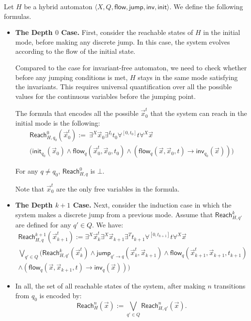 \documentclass[envcountsect]{llncs}
\newcommand{\flow}{\mathsf{flow}}
\newcommand{\jump}{\mathsf{jump}}
\newcommand{\inv}{\mathsf{inv}}
\newcommand{\init}{\mathsf{init}}
\newcommand{\reach}{\mathsf{Reach}}
\begin{document}
\begin{definition}[$\reach_H^n(\vec x)$, General Case]

Let $H$ be a hybrid automaton $\langle X, Q, \flow, \jump, \inv, \init\rangle$.
We define the following formulas. 

\begin{itemize}
\item {\bf The Depth $0$ Case.} First, consider the reachable states of $H$ in
the initial mode, before making any discrete jump. In this case, the system
evolves according to the flow of the initial state. 

Compared to the case for invariant-free automaton, we need to check whether
before any jumping conditions is met, $H$ stays in the same mode satisfying the
invariants. This requires universal quantification over all the possible values
for the continuous variables before the jumping point. 

The formula that encodes all the possible $\vec x_0^t$ that the system can
reach in the initial mode is the following:
\begin{multline*}
\reach^0_{H,q_0} (\vec x_0^t):=\ \exists^X \vec x_0 \exists^{I_t}
t_0\forall^{[0,t_0]} t\forall^X \vec x\\ \Big(\init_{q_0}(\vec x_0)\wedge
\flow_q(\vec x_0^t, \vec x_0, t_0)\wedge (\flow_q(\vec x, \vec x_0,
t)\rightarrow\inv_{q_0}(\vec x))\Big)
\end{multline*}

For any $q\neq q_0$, $\reach^0_{H,q}$ is $\bot$. 

Note that $\vec x_0^t$ are the only free variables in the formula. 



\item {\bf The Depth $k+1$ Case.} Next, consider the induction case in which
the system makes a discrete jump from a previous mode. Assume that
$\reach^k_{H,q'}$ are defined for any $q'\in Q$. We have:
\begin{multline*}
\reach^{k+1}_{H,q}(\vec x_{k+1}^t):=  \exists^X \vec x_k^t \exists^X \vec
x_{k+1}\exists^{T} t_{k+1}\forall^{[0,t_{k+1}]}t\forall^X \vec x \\
\bigvee_{q'\in Q} (\reach^k_{H,q'} (\vec x_k^t) \wedge \jump_{q'\rightarrow
q}(\vec x_k^t, \vec x_{k+1}) \wedge \flow_{q}(\vec x_{k+1}^t, \vec x_{k+1},
t_{k+1})\\
\wedge(\flow_q(\vec x, \vec x_{k+1}, t)\rightarrow \inv_q(\vec x)))
\end{multline*}


\item In all, the set of all reachable states of the system, after making $n$
transitions from $q_0$ is encoded by: 
$$\reach^n_{H}(\vec x) := \bigvee_{q'\in Q} \reach^n_{H,q'}(\vec x).$$


\end{itemize}
\end{definition}
\end{document}
